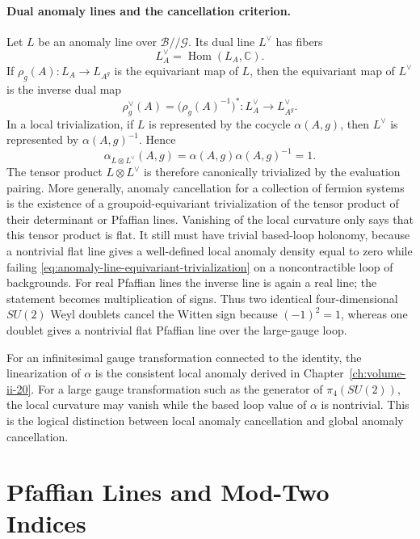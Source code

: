 \paragraph{Dual anomaly lines and the cancellation criterion.}
Let \(L\) be an anomaly line over \(\mathcal B//\mathcal G\).  Its dual line
\(L^\vee\) has fibers
\[
  L_A^\vee=\operatorname{Hom}(L_A,\mathbb C).
\]
If \(\rho_g(A):L_A\to L_{A^g}\) is the equivariant map of \(L\), then the
equivariant map of \(L^\vee\) is the inverse dual map
\[
  \rho_g^\vee(A)
  =
  \bigl(\rho_g(A)^{-1}\bigr)^{*}
  :
  L_A^\vee\longrightarrow L_{A^g}^\vee .
\]
In a local trivialization, if \(L\) is represented by the cocycle
\(\alpha(A,g)\), then \(L^\vee\) is represented by
\(\alpha(A,g)^{-1}\).  Hence
\begin{equation}
  \alpha_{L\otimes L^\vee}(A,g)
  =
  \alpha(A,g)\alpha(A,g)^{-1}
  =
  1 .
  \label{eq:anomaly-line-dual-cancellation-cocycle}
\end{equation}
The tensor product \(L\otimes L^\vee\) is therefore canonically trivialized by
the evaluation pairing.  More generally, anomaly cancellation for a collection
of fermion systems is the existence of a groupoid-equivariant trivialization
of the tensor product of their determinant or Pfaffian lines.  Vanishing of
the local curvature only says that this tensor product is flat.  It still
must have trivial based-loop holonomy, because a nontrivial flat line gives a
well-defined local anomaly density equal to zero while failing
\eqref{eq:anomaly-line-equivariant-trivialization} on a noncontractible loop
of backgrounds.  For real Pfaffian lines the inverse line is again a real
line; the statement becomes multiplication of signs.  Thus two identical
four-dimensional \(SU(2)\) Weyl doublets cancel the Witten sign because
\((-1)^2=1\), whereas one doublet gives a nontrivial flat Pfaffian line over
the large-gauge loop.

For an infinitesimal gauge transformation connected to the identity, the
linearization of \(\alpha\) is the consistent local anomaly derived in
Chapter~\ref{ch:volume-ii-20}.  For a large gauge transformation such as the
generator of \(\pi_4(SU(2))\), the local curvature may vanish while the based
loop value of \(\alpha\) is nontrivial.  This is the logical distinction
between local anomaly cancellation and global anomaly cancellation.

\section{Pfaffian Lines and Mod-Two Indices}

